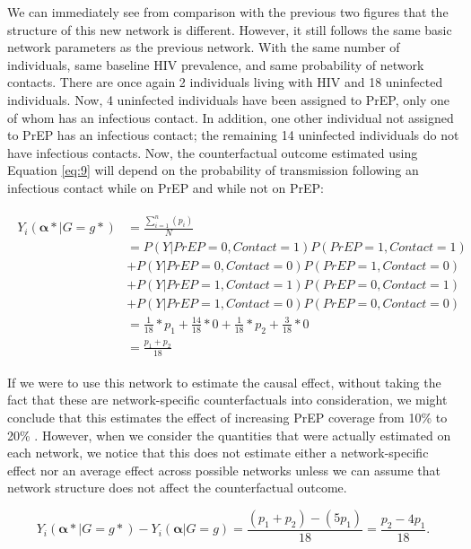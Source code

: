 \documentclass{article}
\theoremstyle{definition}
\begin{document}
We can immediately see from comparison with the previous two figures that the structure of this new network is different. However, it still follows the same basic network parameters as the previous network. With the same number of individuals, same baseline HIV prevalence, and same probability of network contacts. There are once again 2 individuals living with HIV and 18 uninfected individuals. Now, 4 uninfected individuals have been assigned to PrEP, only one of whom has an infectious contact. In addition, one other individual not assigned to PrEP has an infectious contact; the remaining 14 uninfected individuals do not have infectious contacts. Now, the counterfactual outcome estimated using Equation \ref{eq:9} will depend on the probability of transmission following an infectious contact while on PrEP and while not on PrEP:

\begin{align}
\begin{split}
Y_{i}\left(\mathbf{\alpha*}|G=g*\right) & = \frac{\sum_{i=1}^{n}(p_{i})}{N}  \\ 
& = P\left(Y|PrEP = 0, Contact = 1\right)P\left(PrEP = 1, Contact = 1\right)  \\ \nonumber
& +P\left(Y|PrEP = 0, Contact = 0\right)P\left(PrEP = 1, Contact = 0\right)  \\ \nonumber
& +P\left(Y|PrEP = 1, Contact = 1\right)P\left(PrEP = 0, Contact = 1\right) \\ \nonumber
&  +P\left(Y|PrEP = 1, Contact = 0\right)P\left(PrEP = 0, Contact = 0\right) \\ \nonumber
 &= \frac{1}{18}*p_1 +  \frac{14}{18}*0 +\frac{1}{18}*p_2 +  \frac{3}{18}*0 \\ \nonumber
 &=\frac{p_1+p_2}{18}  \nonumber
 \end{split}
\end{align}

If we were to use this network to estimate the causal effect, without taking the fact that these are network-specific counterfactuals into consideration, we might conclude that this estimates the effect of increasing PrEP coverage from 10\% to 20\% . However, when we consider the quantities that were actually estimated on each network, we notice that this does not estimate either a network-specific effect nor an average effect across possible networks unless we can assume that network structure does not affect the counterfactual outcome. 

\begin{equation}\label{eq:12}
Y_{i}\left(\mathbf{\alpha*}|G=g*\right) -Y_{i}\left(\mathbf{\alpha}|G=g\right) = \frac{\left(p_1 +p_2\right)-\left(5p_1\right)}{18}= \frac{p_2-4p_1}{18}.
\end{equation}
\end{document}
